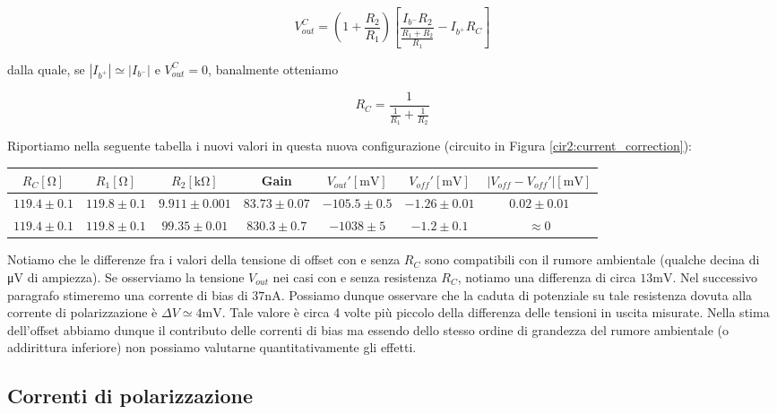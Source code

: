 \begin{equation}
V_{out}^{C} = \left( 1+\frac{R_2}{R_1} \right)\left[ \frac{I_{b^-}R_2}{\frac{R_1+R_2}{R_1}} - I_{b^+} R_C\right]
\label{eq2:Vout_currents}
\end{equation}

dalla quale, se $|I_{b^+}|\simeq|I_{b^-}|$ e $V_{out}^{C}=0$, banalmente otteniamo

$$R_C=\frac{1}{\frac{1}{R_1} + \frac{1}{R_2}} $$



Riportiamo nella seguente tabella i nuovi valori in questa nuova configurazione (circuito in Figura \ref{cir2:current_correction}):

\begin{center}
\begin{tabular}{c|c|c|c|c|c|c}
$R_C [\si{\ohm}]$& $R_1[\si{\ohm}]$ & $R_2[\si{\kilo\ohm}]$ & Gain & $V_{out}' [\si{\milli\volt}]$ & $V_{off}' [\si{\milli\volt}]$ & $|V_{off}-V_{off}'|[\si{\milli\volt}]$ \\ 
\hline 
$119.4\pm0.1$ & $119.8\pm0.1$ & $9.911\pm0.001$  & $83.73 \pm 0.07$ & $-105.5 \pm 0.5$ & $-1.26 \pm0.01$ & $0.02\pm0.01$ \\
\hline
$119.4\pm0.1$ & $119.8\pm0.1$ & $99.35\pm0.01$  & $830.3\pm0.7$ &$ -1038 \pm 5$ & $-1.2 \pm 0.1$ & $\approx 0$\\
\end{tabular}
\end{center}

Notiamo che le differenze fra i valori della tensione di offset con e senza $R_C$ sono compatibili con il rumore ambientale (qualche decina di \si{\micro\volt} di ampiezza). Se osserviamo la tensione $V_{out}$ nei casi con e senza resistenza $R_C$, notiamo una differenza di circa $13\si{\milli\volt}$. Nel successivo paragrafo stimeremo una corrente di bias di $37\si{\nano\ampere}$. Possiamo dunque osservare che la caduta di potenziale su tale resistenza dovuta alla corrente di polarizzazione è $\Delta V \simeq 4 \si{\milli\volt}$. Tale valore è circa 4 volte più piccolo della differenza delle tensioni in uscita misurate. Nella stima dell'offset abbiamo dunque il contributo delle correnti di bias ma essendo dello stesso ordine di grandezza del rumore ambientale (o addirittura inferiore) non possiamo valutarne quantitativamente gli effetti. 

\subsection{Correnti di polarizzazione}

